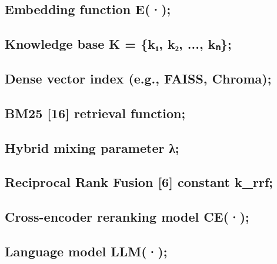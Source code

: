 \subsection*{Embedding function E(·);}\label{embedding-function-e}

\subsection*{Knowledge base K = \{k₁, k₂, ...,
kₙ\};}\label{knowledge-base-k-kux2081-kux2082-...-kux2099}

\subsection*{Dense vector index (e.g., FAISS,
Chroma);}\label{dense-vector-index-e.g.-faiss-chroma}

\subsection*{BM25 {[}16{]} retrieval
function;}\label{bm25-16-retrieval-function}

\subsection*{Hybrid mixing parameter
λ;}\label{hybrid-mixing-parameter-ux3bb}

\subsection*{Reciprocal Rank Fusion {[}6{]} constant
k\_rrf;}\label{reciprocal-rank-fusion-6-constant-k_rrf}

\subsection*{Cross-encoder reranking model
CE(·);}\label{cross-encoder-reranking-model-ce}

\subsection*{Language model LLM(·);}\label{language-model-llm}


